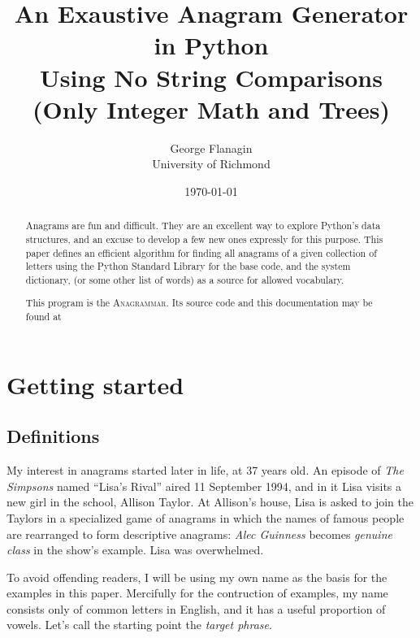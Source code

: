 \documentclass[letterpaper, 11pt]{article}
\title{An Exaustive Anagram Generator in Python\\
Using No String Comparisons\\ 
\Large \vspace{0.7em} (Only Integer Math and Trees)}
\author{George Flanagin\\University of Richmond\\\lit{gflanagin@richmond.edu}}
\date{\today}
\providecommand{\anagrammar}{A\textsc{nagrammar}\xspace}
\begin{document}
\maketitle
\begin{abstract}
Anagrams are fun and difficult. They are an excellent way to explore
Python's data structures, and an excuse to develop a few new ones
expressly for this purpose. This paper defines an efficient algorithm
for finding all anagrams of a given collection of letters using the
Python Standard Library for the base code, and the system dictionary,
(or some other list of words)
as a source for allowed vocabulary. 

This program is the \anagrammar. Its source code and this documentation
may be found at 

\end{abstract}

\tableofcontents
\listoffigures

\newpage
\pagewiselinenumbers
\section{Getting started}

\subsection{Definitions}
My interest in anagrams started later in life, at 37 years old. An episode of
\emph{The Simpsons} named ``Lisa's Rival'' aired 11 September 1994,
and in it Lisa visits a new girl in the school, Allison
Taylor. At Allison's house, Lisa is asked to join the Taylors in a
specialized game of anagrams in which the names of famous people
are rearranged to form descriptive anagrams: \emph{Alec Guinness}
becomes \emph{genuine class} in the show's example. Lisa was overwhelmed.

To avoid offending readers, I will be using my own
name as the basis for the examples in this paper. Mercifully for
the contruction of examples, my name consists only of common letters
in English, and it has a useful proportion of vowels. Let's call
the starting point the \emph{target phrase}.
\end{document}
